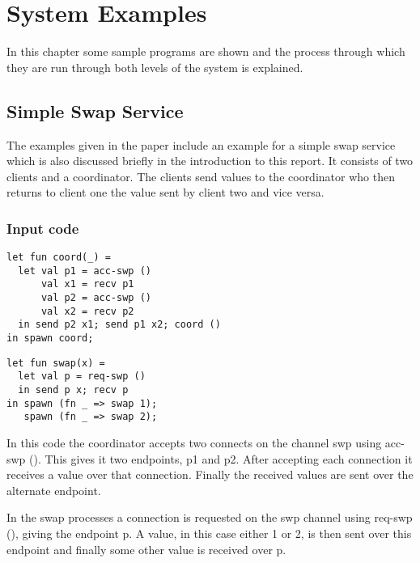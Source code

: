 \chapter{System Examples} \label{examplesChapt}

In this chapter some sample programs are shown and the process through which they are run through both levels of the system is explained. 

\section{Simple Swap Service}

The examples given in the paper \cite{paper1} include an example for a simple swap service which is also discussed briefly in the introduction to this report. It consists of two clients and a coordinator. The clients send values to the coordinator who then returns to client one the value sent by client two and vice versa.

\subsection{Input code}

\begin{minipage}{.45\textwidth}
\begin{lstlisting}[backgroundcolor=\color{white},numbers=none]
let fun coord(_) =
  let val p1 = acc-swp ()
      val x1 = recv p1
      val p2 = acc-swp ()
      val x2 = recv p2
  in send p2 x1; send p1 x2; coord ()
in spawn coord;
\end{lstlisting}
\end{minipage}
\hfill
\begin{minipage}{.45\textwidth}
\begin{lstlisting}[backgroundcolor=\color{white},numbers=none]
let fun swap(x) =
  let val p = req-swp ()
  in send p x; recv p
in spawn (fn _ => swap 1);
   spawn (fn _ => swap 2);
\end{lstlisting}
\vspace{2em}
\end{minipage} 

In this code the coordinator accepts two connects on the channel swp using acc-swp (). This gives it two endpoints, p1 and p2. After accepting each connection it receives a value over that connection. Finally the received values are sent over the alternate endpoint. 

In the swap processes a connection is requested on the swp channel using req-swp (), giving the endpoint p. A value, in this case either 1 or 2, is then sent over this endpoint and finally some other value is received over p. 

